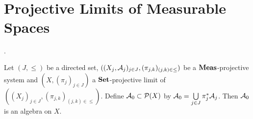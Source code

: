 \documentclass{book}
\begin{document}
\newpage
\section{Projective Limits of Measurable Spaces}

.

\begin{ex} 
	Let $(J, {\leq})$ be a directed set, $((X_j, \mathcal{A}_j)_{j \in J}, (\pi_{j,k})_{(j,k) \in \leq})$ be a $\operatorname*{\text{\textbf{Meas}}}$-projective system and $(X, (\pi_j)_{j \in J})$ a $\operatorname*{\text{\textbf{Set}}}$-projective limit of $((X_j)_{j \in J}, (\pi_{j,k})_{(j,k) \in \leq})$. Define $\mathcal{A}_0 \subset \mathcal{P}(X)$ by $\mathcal{A}_0 = \bigcup\limits_{j \in J} \pi_j^*\mathcal{A}_j$. Then $\mathcal{A}_0$ is an algebra on $X$. 
\end{ex}
\end{document}
